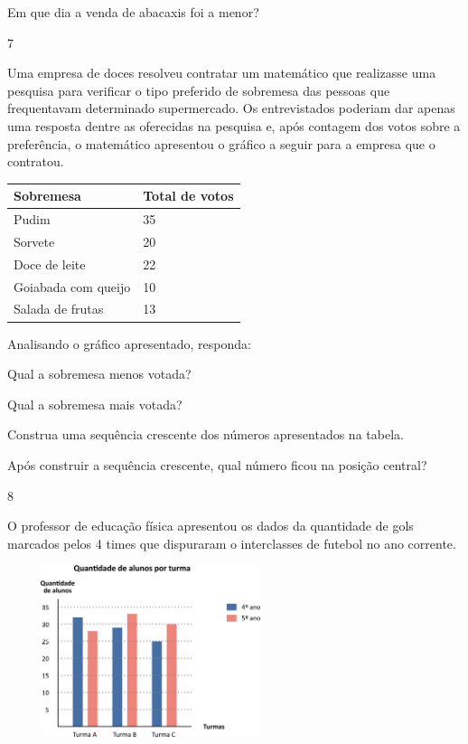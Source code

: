 {\begin{escolha}
{\begin{escolha}
\item
  Em que dia a venda de abacaxis foi a menor?
\end{escolha}

\num{7}

Uma empresa de doces resolveu contratar um matemático que realizasse uma
pesquisa para verificar o tipo preferido de sobremesa das pessoas que
frequentavam determinado supermercado. Os entrevistados poderiam dar
apenas uma resposta dentre as oferecidas na pesquisa e, após contagem dos
votos sobre a preferência, o matemático apresentou o gráfico a seguir
para a empresa que o contratou.

\begin{longtable}[]{@{}ll@{}}
\toprule
Sobremesa & Total de votos\tabularnewline
\midrule
\endhead
Pudim & 35\tabularnewline
Sorvete & 20\tabularnewline
Doce de leite & 22\tabularnewline
Goiabada com queijo & 10\tabularnewline
Salada de frutas & 13\tabularnewline
\bottomrule
\end{longtable}

Analisando o gráfico apresentado, responda:

\begin{escolha}

\item
  Qual a sobremesa menos votada?

\item
  Qual a sobremesa mais votada?

\item
  Construa uma sequência crescente dos números apresentados na tabela.

\item
  Após construir a sequência crescente, qual número ficou na posição
  central?
\end{escolha}

\num{8}

O professor de educação física apresentou os dados da quantidade de gols
marcados pelos 4 times que dispuraram o interclasses de futebol no ano
corrente.


\includegraphics[width=3.30769in,height=1.97201in]{media/image97.png}

}
\end{escolha}}
